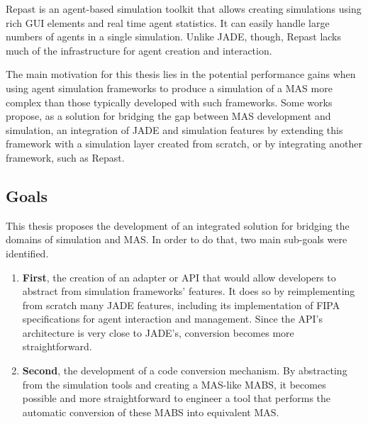 \documentclass[9pt,a4paper]{extarticle}
\begin{document}
\begin{multicols}{2}
Repast \cite{collier2003repast} is an agent-based simulation toolkit that allows creating simulations using rich GUI elements and real time agent statistics. It can easily handle large numbers of agents in a single simulation. Unlike JADE, though, Repast lacks much of the infrastructure for agent creation and interaction.

The main motivation for this thesis lies in the potential performance gains when using agent simulation frameworks to produce a simulation of a MAS more complex than those typically developed with such frameworks. Some works \cite{garcia2011misia,gormer2011jrep} propose, as a solution for bridging the gap between MAS development and simulation, an integration of JADE and simulation features by extending this framework with a simulation layer created from scratch, or by integrating another framework, such as Repast.

\subsection{Goals}
This thesis proposes the development of an integrated solution for bridging the domains of simulation and MAS. In order to do that, two main sub-goals were identified.

\begin{enumerate}
  \item \textbf{First}, the creation of an adapter or API that would allow developers to abstract from simulation frameworks' features. It does so by reimplementing from scratch many JADE features, including its implementation of FIPA specifications for agent interaction and management. Since the API's architecture is very close to JADE's, conversion becomes more straightforward.
  \item \textbf{Second}, the development of a code conversion mechanism. By abstracting from the simulation tools and creating a MAS-like MABS, it becomes possible and more straightforward to engineer a tool that performs the automatic conversion of these MABS into equivalent MAS.
\end{enumerate}



\end{multicols}
\end{document}
